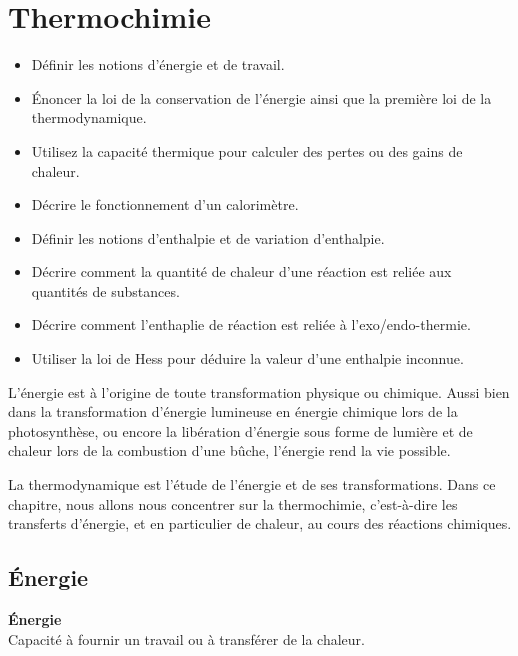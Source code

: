 \documentclass[
  11pt,
  french,
  a4paper,
  openany]{book}
\providecommand{\tightlist}{%
  \setlength{\itemsep}{0pt}\setlength{\parskip}{0pt}}
\begin{document}
\hypertarget{thermochimie}{%
\chapter{Thermochimie}\label{thermochimie}}

\begin{objectives}

\begin{itemize}
\tightlist
\item
  Définir les notions d'énergie et de travail.
\item
  Énoncer la loi de la conservation de l'énergie ainsi que la première loi de la thermodynamique.
\item
  Utilisez la capacité thermique pour calculer des pertes ou des gains de chaleur.
\item
  Décrire le fonctionnement d'un calorimètre.
\item
  Définir les notions d'enthalpie et de variation d'enthalpie.
\item
  Décrire comment la quantité de chaleur d'une réaction est reliée aux quantités de substances.
\item
  Décrire comment l'enthaplie de réaction est reliée à l'exo/endo-thermie.
\item
  Utiliser la loi de Hess pour déduire la valeur d'une enthalpie inconnue.
\end{itemize}


\end{objectives}

L'énergie est à l'origine de toute transformation physique ou chimique. Aussi bien dans la transformation d'énergie lumineuse en énergie chimique lors de la photosynthèse, ou encore la libération d'énergie sous forme de lumière et de chaleur lors de la combustion d'une bûche, l'énergie rend la vie possible.

La thermodynamique est l'étude de l'énergie et de ses transformations. Dans ce chapitre, nous allons nous concentrer sur la thermochimie, c'est-à-dire les transferts d'énergie, et en particulier de chaleur, au cours des réactions chimiques.

\hypertarget{uxe9nergie}{%
\section{Énergie}\label{uxe9nergie}}

\begin{tcolorbox}
\textbf{Énergie}\\
Capacité à fournir un travail ou à transférer de la chaleur.

\end{tcolorbox}
\end{document}
